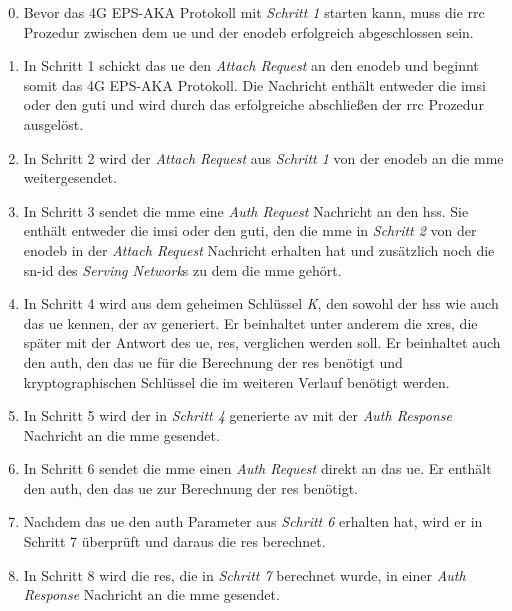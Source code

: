 \begin{enumerate}
\setcounter{enumi}{-1}
\item Bevor das 4G EPS-AKA Protokoll mit \textit{Schritt 1} starten kann, muss die \gls{rrc} Prozedur zwischen dem \gls{ue} und der \gls{enodeb} erfolgreich abgeschlossen sein.

\item In Schritt 1 schickt das \gls{ue} den \textit{Attach Request} an den \gls{enodeb} und beginnt somit das 4G EPS-AKA Protokoll.
Die Nachricht enthält entweder die \gls{imsi} oder den \gls{guti} und wird durch das erfolgreiche abschließen der \gls{rrc} Prozedur ausgelöst.

\item In Schritt 2 wird der \textit{Attach Request} aus \textit{Schritt 1} von der \gls{enodeb} an die \gls{mme} weitergesendet.

\item In Schritt 3 sendet die \gls{mme} eine \textit{Auth Request} Nachricht an den \gls{hss}.
Sie enthält entweder die \gls{imsi} oder den \gls{guti}, den die \gls{mme} in \textit{Schritt 2} von der \gls{enodeb} in der \textit{Attach Request} Nachricht erhalten hat und zusätzlich noch die \gls{sn-id} des \textit{Serving Network}s zu dem die \gls{mme} gehört.

\item In Schritt 4 wird aus dem geheimen Schlüssel \textit{K}, den sowohl der \gls{hss} wie auch das \gls{ue} kennen, der \gls{av} generiert.
Er beinhaltet unter anderem die \gls{xres}, die später mit der Antwort des \gls{ue}, \gls{res}, verglichen werden soll.
Er beinhaltet auch den \gls{auth}, den das \gls{ue} für die Berechnung der \gls{res} benötigt und kryptographischen Schlüssel die im weiteren Verlauf benötigt werden.

\item In Schritt 5 wird der in \textit{Schritt 4} generierte \gls{av} mit der \textit{Auth Response} Nachricht an die \gls{mme} gesendet.

\item In Schritt 6 sendet die \gls{mme} einen \textit{Auth Request} direkt an das \gls{ue}.
Er enthält den \gls{auth}, den das \gls{ue} zur Berechnung der \gls{res} benötigt.

\item Nachdem das \gls{ue} den \gls{auth} Parameter aus \textit{Schritt 6} erhalten hat, wird er in Schritt 7 überprüft und daraus die \gls{res} berechnet.

\item In Schritt 8 wird die \gls{res}, die in \textit{Schritt 7} berechnet wurde, in einer \textit{Auth Response} Nachricht an die \gls{mme} gesendet.


\end{enumerate}
